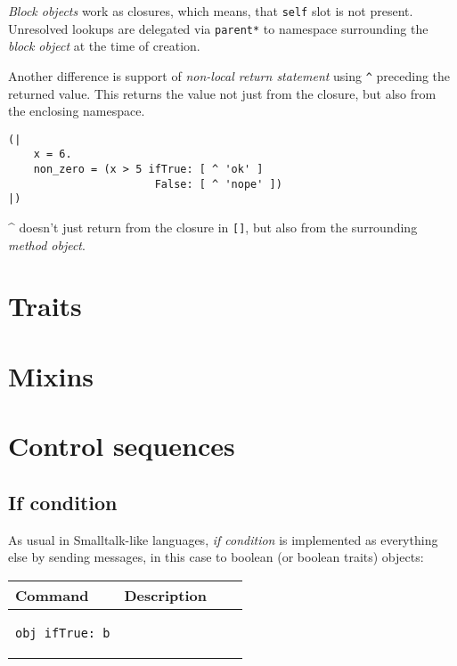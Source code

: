 \documentclass[10pt]{article}
\begin{document}
\begin{multicols*}{3}
\textit{Block objects} work as closures, which means, that \texttt{self} slot is not present. Unresolved lookups are delegated via \texttt{parent*} to namespace surrounding the \textit{block object} at the time of creation.

Another difference is support of \textit{non-local return statement} using \texttt{\^} preceding the returned value. This returns the value not just from the closure, but also from the enclosing namespace.

\begin{lstlisting}
(|
    x = 6.
    non_zero = (x > 5 ifTrue: [ ^ 'ok' ]
                       False: [ ^ 'nope' ])
|)
\end{lstlisting}

\^{} doesn't just return from the closure in \texttt{[]}, but also from the surrounding \textit{method object}.




\pagebreak %
\section{Traits}

\section{Mixins}

\section{Control sequences}
\subsection{If condition}

As usual in Smalltalk-like languages, \textit{if condition} is implemented as everything else by sending messages, in this case to boolean (or boolean traits) objects:

\vspace*{0.2cm}

\begin{tabular}{ p{70pt} p{140pt} l l }
Command & Description \\ \hline

\begin{lstlisting}
obj ifTrue: b
\end{lstlisting}
&\vspace*{0.25cm}


\end{tabular}
\end{multicols*}
\end{document}
